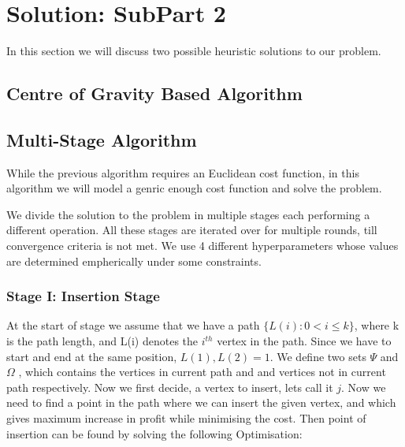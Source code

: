 \documentclass{article}
\begin{document}

 
\section{Solution: SubPart 2}
  
In this section we will discuss two possible heuristic solutions to our problem. 

\subsection{Centre of Gravity Based Algorithm}
\cite{DEWILDE20131700} 

\subsection{Multi-Stage Algorithm}

While the previous algorithm requires an Euclidean cost function, in this algorithm we will model a genric enough cost function and solve the problem.

We divide the solution to the problem in multiple stages each performing a different operation. All these stages are iterated over for multiple rounds, till convergence criteria is not met.
We use 4 different hyperparameters whose values are determined empherically under some constraints.

\subsubsection{Stage I: Insertion Stage}

At the start of stage we assume that we have a path $\{L(i) : 0<i \leq k\}$, where k is the path length, and L(i) denotes the $i^{th}$ vertex in the path.
Since we have to start and end at the same position,
$L(1),L(2) = 1$.
We define two sets $\Psi$ and $\Omega$
, which contains the vertices in current path and and vertices not in current path respectively.
Now we first decide, a vertex to insert, lets call it $j$. Now we need to find a point in the path where we can insert the given vertex, and which gives maximum increase in profit while minimising the cost.
Then point of insertion can be found by solving the following Optimisation:
            
\end{document}
